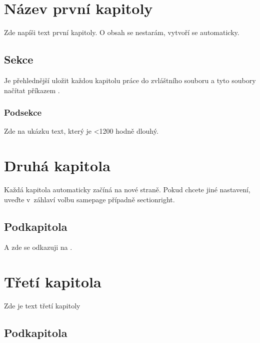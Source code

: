\documentclass{vskpou} %
\begin{document}
\section{Název první kapitoly}
Zde napíši text první kapitoly. O obsah se nestarám, vytvoří se automaticky.

\subsection{Sekce}
Je přehlednější uložit každou kapitolu práce do zvláštního souboru a tyto soubory načítat příkazem \verb--.
%

\subsubsection{Podsekce}
Zde na ukázku text, který je
{ \newcount\ii \loop\ifnum\ii<1200 \advance{} hodně \repeat}%
dlouhý.


\section{Druhá kapitola}
Každá kapitola automaticky začíná na nové straně. Pokud chcete jiné nastavení, uveďte v~záhlaví volbu samepage případně sectionright.
%


\subsection{Podkapitola}
A zde se odkazuji na \cite{Knuth}.



\section{Třetí kapitola}
Zde je text třetí kapitoly
%
\subsection{Podkapitola}

\stranyresume
\end{document}

